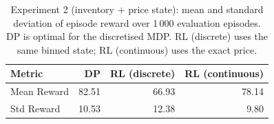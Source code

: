 \begin{table}[h]
\centering
\begin{tabular}{lrrr}
\toprule
Metric & DP & RL (discrete) & RL (continuous) \\
\midrule
Mean Reward & 82.51 & 66.93 & 78.14 \\
Std Reward & 10.53 & 12.38 & 9.80 \\
\bottomrule
\end{tabular}
\caption{Experiment 2 (inventory + price state): mean and standard deviation of episode reward over 1\,000 evaluation episodes. DP is optimal for the discretised MDP. RL (discrete) uses the same binned state; RL (continuous) uses the exact price.}
\label{tab:exp2}
\end{table}
